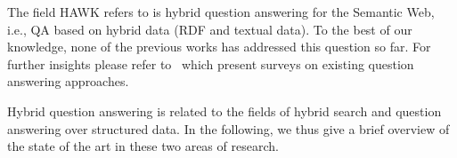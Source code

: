 The field HAWK refers to is hybrid question answering for the Semantic Web, i.e., QA based on hybrid data (RDF and textual data).
To the best of our knowledge, none of the previous works has addressed this question so far.
For further insights please refer to~\cite{Kolomiyets:2011,DBLP:journals/semweb/LopezUSM11} which present surveys on existing question answering approaches.

Hybrid question answering is related to the fields of hybrid search and question answering over structured data. In the following, we thus give a brief overview of the state of the art in these two areas of research.

